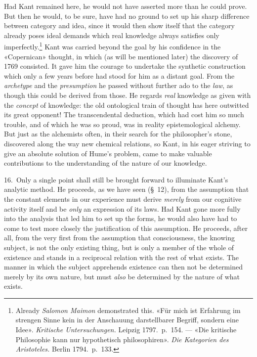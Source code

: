 \documentclass[12pt,a4paper]{article}
\newcommand{\opage}[1]{\marginnote{\footnotesize\textit{[#1]}}}
\begin{document}
Had Kant remained here, he would not have asserted more than he could
prove. But then he would, to be sure, have had no ground to set up his
sharp difference between category and idea, since it would then show itself
that the category already poses ideal demands which real knowledge always
satisfies only imperfectly.\footnote{Already \emph{Salomon Maimon} demonstrated
this. «Für mich ist Erfahrung im strengen Sinne kein in der Anschauung
darstellbarer Begriff, sondern eine Idee». \textit{Kritische
Untersuchungen.} Leipzig 1797.\ p.\ 154. --- «Die kritische Philosophie
kann nur hypothetisch philosophiren». \textit{Die Kategorien des
Aristoteles.} Berlin 1794.\ p.\ 133.} Kant was carried beyond the goal by
his confidence in the «Copernican» thought, in which (as will be mentioned
later) the discovery of 1769 consisted. It gave him the courage to
undertake the synthetic construction which only a few years before had
stood for him \opage{33}as a distant goal. From the \emph{archetype} and the \emph{presumption} he
passed without further ado to the \emph{law}, as though this could be derived from
those. He regards \emph{real} knowledge as given with the \emph{concept} of knowledge:
the old ontological train of thought has here outwitted its great opponent!
The transcendental deduction, which had cost him so much trouble, and of
which he was so proud, was in reality epistemological alchemy. But just as
the alchemists often, in their search for the philosopher's stone,
discovered along the way new chemical relations, so Kant, in his eager
striving to give an absolute solution of Hume's problem, came to make
valuable contributions to the understanding of the nature of our knowledge.

16.\ Only a single point shall still be brought forward to illuminate
Kant's analytic method. He proceeds, as we have seen (§\ 12), from the
assumption that the constant elements in our experience must derive \emph{merely}
from our cognitive activity itself and be \emph{only} an expression of its laws.
Had Kant gone more fully into the analysis that led him to set up the
forms, he would also have had to come to test more closely the
justification of this assumption. He proceeds, after all, from the very
first from the assumption that consciousness, the knowing subject, is not
the only existing thing, but is only a member of the whole of existence and
stands in a reciprocal relation with the rest of what exists. The manner in
which the subject apprehends existence can then not be determined merely by
its own nature, but must \emph{also} be determined by the nature of what exists.
\end{document}
